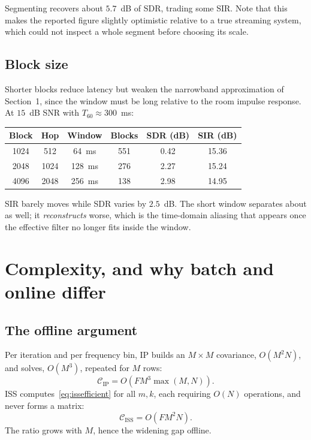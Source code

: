 \documentclass[11pt,a4paper]{article}
\begin{document}
Segmenting recovers about $5.7$~dB of SDR, trading some SIR. Note that this
makes the reported figure slightly optimistic relative to a true streaming
system, which could not inspect a whole segment before choosing its scale.

\subsection{Block size}
\label{sec:blocksize}

Shorter blocks reduce latency but weaken the narrowband approximation of
Section~1, since the window must be long relative to the room impulse response.
At $15$~dB SNR with $T_{60}\approx300$~ms:

\begin{table}[h]
\centering
\begin{tabular}{cccccc}
\toprule
Block & Hop & Window & Blocks & SDR (dB) & SIR (dB) \\
\midrule
1024 & 512 & 64~ms & 551 & 0.42 & 15.36 \\
2048 & 1024 & 128~ms & 276 & 2.27 & 15.24 \\
4096 & 2048 & 256~ms & 138 & 2.98 & 14.95 \\
\bottomrule
\end{tabular}
\end{table}

SIR barely moves while SDR varies by $2.5$~dB. The short window separates about
as well; it \emph{reconstructs} worse, which is the time-domain aliasing that
appears once the effective filter no longer fits inside the window.

\section{Complexity, and why batch and online differ}
\label{sec:complexity}

\subsection{The offline argument}
\label{sec:whyonlinediffers}

Per iteration and per frequency bin, IP builds an $M\times M$ covariance,
$O(M^2N)$, and solves, $O(M^3)$, repeated for $M$ rows:
%
\begin{equation}
\mathcal{C}_{\text{IP}} = O\!\left(F M^3 \max(M, N)\right).
\end{equation}
%
ISS computes~\eqref{eq:issefficient} for all $m,k$, each requiring $O(N)$
operations, and never forms a matrix:
%
\begin{equation}
\mathcal{C}_{\text{ISS}} = O\!\left(F M^2 N\right).
\end{equation}
%
The ratio grows with $M$, hence the widening gap offline.
\end{document}
